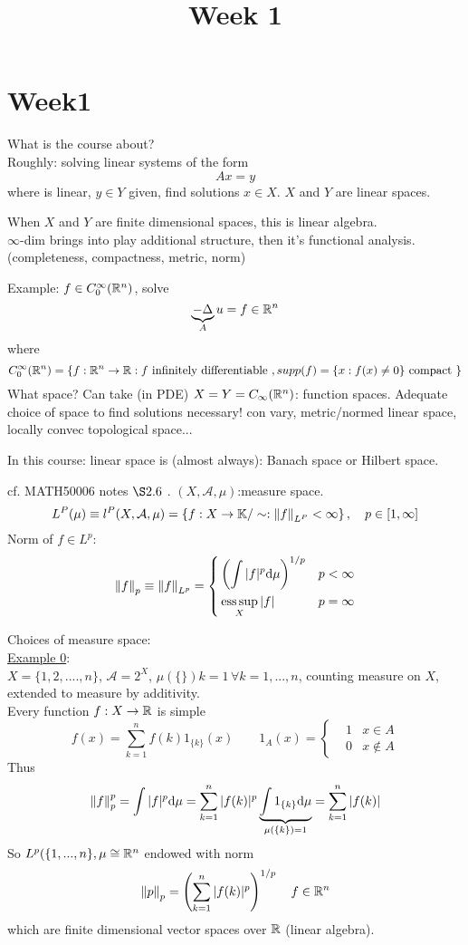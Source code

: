 \documentclass{article}
\title{Week 1}
\author{\aut}
\begin{document}
\maketitle
\section{Week1}
What is the course about?\\

Roughly: solving linear systems of the form
$$Ax=y$$
where  is linear, $y\in Y$ given, find solutions $x\in X$. $X$ and $Y$ are linear spaces.
\begin{remark}
	When $X$ and $Y$ are finite dimensional spaces, this is linear algebra.\\
	$\infty$-dim brings into play additional structure, then it's functional analysis. (completeness, compactness, metric, norm)
\end{remark}

Example: $f\in C_0^\infty (\mathbb{R}^n)$, solve
$$
	\underbrace{-\Delta}_A u=f\in\mathbb{R}^n
$$where
$$
	C_0^\infty(\mathbb{R}^n)=\left\{
	f:\mathbb{R}^n\to\mathbb{R}:f\text{ infinitely differentiable }, supp(f)=\{x:f(x)\neq0\} \text{ compact }
	\right\}
$$
What space?
Can take (in PDE) $X=Y=C_\infty(\mathbb{R}^n)$: function spaces.
Adequate choice of space to find solutions necessary!
con vary, metric/normed linear space, locally convec topological space...

In this course: linear space is (almost always): Banach space or Hilbert space.
\begin{example}
	cf. MATH50006 notes $\S2.6$ .
	$(X,\mathcal{A},\mu)$:measure space.
	$$
		L^P(\mu)\equiv l^P(X,\mathcal{A},\mu)=
		\left\{
		f:X\to\mathbb{K}/\sim:\left\|{f}\right\|_{L^P}<\infty
		\right\},\quad p\in[1,\infty]
	$$
	Norm of $f\in L^p$:
	$$
		\left\|{f}\right\|_p\equiv\left\|{f}\right\|_{L^p}=
		\left\{
		\begin{aligned}
			 & \left(\int|f|^p{\rm d}\mu\right)^{1/p} & p<
			\infty                                               \\
			 & \operatorname*{ess\,sup}_X |f|                          & p=\infty
		\end{aligned}\right.
	$$
\end{example}


Choices of measure space:\\
\underline{Example 0}:\\ $X=\{1,2,....,n\}$, $\mathcal{A}=2^X$, $\mu(\{\})k=1\,\forall k=1,...,n$, counting measure on $X$, extended to measure by additivity.\\
Every function $f:X\to\mathbb{R}$ is simple
$$
	f(x)=\sum^n_{k=1}f(k)1_{\{k\}}(x)\qquad 1_A(x)=
	\left\{\begin{aligned}
		 & 1 & x\in A    \\
		 & 0 & x\notin A
	\end{aligned}\right.
$$
Thus
$$
	\left\|{f}\right\|_p^p=\int|f|^p{\rm d}\mu=\sum_{k=1}^n|f(k)|^p
	\underbrace{\int1_{\{k\}}{\rm d}\mu}_{\mu(\{k\})=1}
	=\sum_{k=1}^n|f(k)|
$$
So $L^p(\{1,...,n\},\mu\cong\mathbb{R}^n$ endowed with norm
$$
	\left\|{p}\right\|_p=\left(\sum_{k=1}^n|f(k)|^p\right)^{1/p}\quad f\in\mathbb{R}^n
$$
which are finite dimensional vector spaces over $\mathbb{R}$ (linear algebra).
\end{document}
